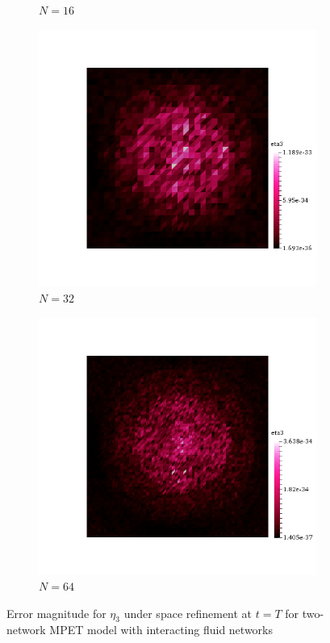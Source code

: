 \begin{figure}[h!]
\begin{subfigure}[b]{0.24\textwidth}
    \caption{$N=16$}
  \end{subfigure}
  \begin{subfigure}[b]{0.24\textwidth}
    \includegraphics[width=\textwidth,height=\textheight,keepaspectratio,height=\textheight,keepaspectratio]{figures/2_mpet/default/space/eta3_32.png}
    \caption{$N=32$}
  \end{subfigure}
  \begin{subfigure}[b]{0.24\textwidth}
    \includegraphics[width=\textwidth,height=\textheight,keepaspectratio,height=\textheight,keepaspectratio]{figures/2_mpet/default/space/eta3_64.png}
    \caption{$N=64$}
  \end{subfigure}
  \caption{Error magnitude for $\eta_3$ under space refinement at $t=T$ for two-network MPET model with interacting fluid networks} \label{fig:bb_default_eta3}
\end{figure}

